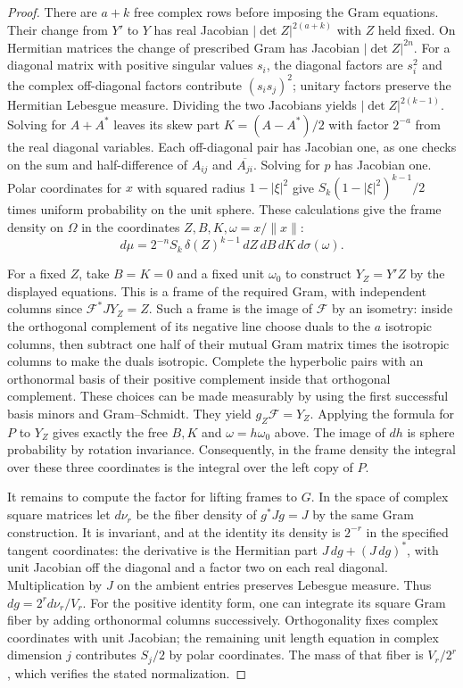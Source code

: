 \documentclass[a4paper,11pt]{article}
\theoremstyle{definition}
\theoremstyle{remark}
\numberwithin{equation}{section}
\begin{document}
\begin{proof}
There are \(a+k\) free complex rows before imposing the Gram
equations. Their change from \(Y'\) to \(Y\) has real Jacobian
\(|\det Z|^{2(a+k)}\) with \(Z\) held fixed. On Hermitian
matrices the change of prescribed Gram has Jacobian
\(|\det Z|^{2n}\). For a diagonal matrix with positive singular
values \(s_i\), the diagonal factors are \(s_i^2\) and the
complex off-diagonal factors contribute \((s_i s_j)^2\);
unitary factors preserve the Hermitian Lebesgue measure.
Dividing the two Jacobians yields \(|\det Z|^{2(k-1)}\).
Solving for \(A+A^*\) leaves its skew part \(K=(A-A^*)/2\)
with factor \(2^{-a}\) from the real diagonal variables. Each
off-diagonal pair has Jacobian one, as one checks on the sum
and half-difference of \(A_{ij}\) and \(\overline{A_{ji}}\).
Solving for \(p\) has Jacobian one. Polar coordinates for \(x\)
with squared radius \(1-|\xi|^2\) give
\(S_k(1-|\xi|^2)^{k-1}/2\) times uniform probability on the unit
sphere. These calculations give the frame density on \(\Omega\)
in the coordinates \(Z,B,K,\omega=x/\|x\|\):
\[
             d\mu=2^{-n}S_k\,\delta(Z)^{k-1}
                         \,dZ\,dB\,dK\,d\sigma(\omega).
\]

For a fixed \(Z\), take \(B=K=0\) and a fixed unit \(\omega_0\)
to construct \(Y_Z=Y'Z\) by the displayed equations. This is
a frame of the required Gram, with independent columns since
\(\mathcal F^*JY_Z=Z\). Such a frame is the image of \(\mathcal F\)
by an isometry: inside the orthogonal complement of its negative
line choose duals to the \(a\) isotropic columns, then subtract
one half of their mutual Gram matrix times the isotropic columns
to make the duals isotropic. Complete the hyperbolic pairs with
an orthonormal basis of their positive complement inside that
orthogonal complement. These choices can be made measurably
by using the first successful basis minors and Gram--Schmidt.
They yield \(g_Z\mathcal F=Y_Z\). Applying the formula for \(P\)
to \(Y_Z\) gives exactly the free \(B,K\) and
\(\omega=h\omega_0\) above. The image of \(dh\) is sphere
probability by rotation invariance. Consequently, in the frame
density the integral over these three coordinates is the
integral over the left copy of \(P\).

It remains to compute the factor for lifting frames to \(G\).
In the space of complex square matrices let \(d\nu_r\) be the
fiber density of \(g^*Jg=J\) by the same Gram construction.
It is invariant, and at the identity its density is \(2^{-r}\)
in the specified tangent coordinates: the derivative is the
Hermitian part \(J\,dg+(J\,dg)^*\), with unit Jacobian off the
diagonal and a factor two on each real diagonal. Multiplication
by \(J\) on the ambient entries preserves Lebesgue measure.
Thus \(dg=2^r d\nu_r/V_r\). For the positive identity form,
one can integrate its square Gram fiber by adding orthonormal
columns successively. Orthogonality fixes complex coordinates
with unit Jacobian; the remaining unit length equation in
complex dimension \(j\) contributes \(S_j/2\) by polar
coordinates. The mass of that fiber is \(V_r/2^r\), which
verifies the stated normalization.


\end{proof}
\end{document}
